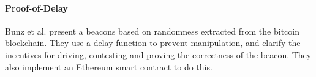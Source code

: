 \paragraph{Proof-of-Delay}
Bunz et al. \cite{bunz2017proofsof} present a beacons based on randomness extracted from the bitcoin blockchain. They use a delay function to prevent manipulation, and clarify the incentives for driving, contesting and proving the correctness of the beacon. They also implement an Ethereum smart contract to do this. 